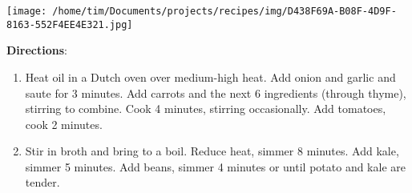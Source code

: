 \documentclass[11pt, twoside, openany]{book}
\begin{document}
\begin{minipage}[t]{\linewidth}
\noindent\begin{minipage}[t]{0.18\linewidth}
\centering \strut\vspace*{-\baselineskip}\newline
\texttt{[image: /home/tim/Documents/projects/recipes/img/D438F69A-B08F-4D9F-8163-552F4EE4E321.jpg]}\\
\end{minipage}\vspace{3mm}
\textbf{Directions}:
\vspace{-3mm}\begin{enumerate}\setlength\itemsep{-1mm}
\item Heat oil in a Dutch oven over medium-high heat. Add onion and garlic and saute for 3 minutes. Add carrots and the next 6 ingredients (through thyme), stirring to combine. Cook 4 minutes, stirring occasionally. Add tomatoes, cook 2 minutes.
\item Stir in broth and bring to a boil. Reduce heat, simmer 8 minutes. Add kale, simmer 5 minutes. Add beans, simmer 4 minutes or until potato and kale are tender. 
\end{enumerate}
\end{minipage}\vspace{8mm}
\end{document}
